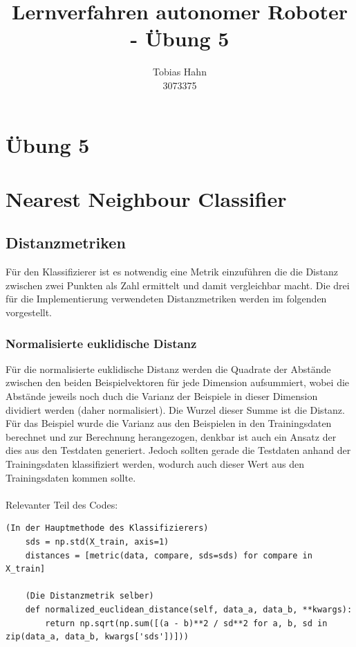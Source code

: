 \documentclass{article}
\title{Lernverfahren autonomer Roboter - Übung 5}
\author{Tobias Hahn\\ 3073375}
\begin{document}
\maketitle
\newpage
\section*{Übung 5}
\section{Nearest Neighbour Classifier}
\subsection{Distanzmetriken}
Für den Klassifizierer ist es notwendig eine Metrik einzuführen die die Distanz zwischen zwei Punkten als Zahl ermittelt und damit vergleichbar macht. Die drei für die Implementierung verwendeten Distanzmetriken werden im folgenden vorgestellt.
\subsubsection{Normalisierte euklidische Distanz}
Für die normalisierte euklidische Distanz werden die Quadrate der Abstände zwischen den beiden Beispielvektoren für jede Dimension aufsummiert, wobei die Abstände jeweils noch duch die Varianz der Beispiele in dieser Dimension dividiert werden (daher normalisiert). Die Wurzel dieser Summe ist die Distanz. Für das Beispiel wurde die Varianz aus den Beispielen in den Trainingsdaten berechnet und zur Berechnung herangezogen, denkbar ist auch ein Ansatz der dies aus den Testdaten generiert. Jedoch sollten gerade die Testdaten anhand der Trainingsdaten klassifiziert werden, wodurch auch dieser Wert aus den Trainingsdaten kommen sollte.
\paragraph{}
Relevanter Teil des Codes:
\begin{lstlisting}[title=Normalisierte euklidische Distanz]
    (In der Hauptmethode des Klassifizierers)
    sds = np.std(X_train, axis=1)
    distances = [metric(data, compare, sds=sds) for compare in X_train]
    
    (Die Distanzmetrik selber)
    def normalized_euclidean_distance(self, data_a, data_b, **kwargs):
        return np.sqrt(np.sum([(a - b)**2 / sd**2 for a, b, sd in zip(data_a, data_b, kwargs['sds'])]))
\end{lstlisting}
\end{document}
